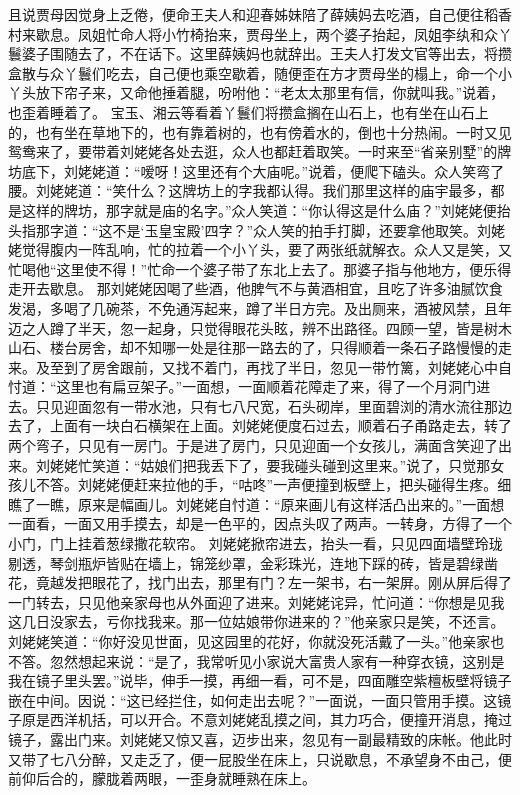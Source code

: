 \documentclass[12pt,oneside]{book}
\begin{document}
且说贾母因觉身上乏倦，便命王夫人和迎春姊妹陪了薛姨妈去吃酒，自己便往稻香村来歇息。凤姐忙命人将小竹椅抬来，贾母坐上，两个婆子抬起，凤姐李纨和众丫鬟婆子围随去了，不在话下。这里薛姨妈也就辞出。王夫人打发文官等出去，将攒盒散与众丫鬟们吃去，自己便也乘空歇着，随便歪在方才贾母坐的榻上，命一个小丫头放下帘子来，又命他捶着腿，吩咐他：“老太太那里有信，你就叫我。”说着，也歪着睡着了。
宝玉、湘云等看着丫鬟们将攒盒搁在山石上，也有坐在山石上的，也有坐在草地下的，也有靠着树的，也有傍着水的，倒也十分热闹。一时又见鸳鸯来了，要带着刘姥姥各处去逛，众人也都赶着取笑。一时来至“省亲别墅”的牌坊底下，刘姥姥道：“嗳呀！这里还有个大庙呢。”说着，便爬下磕头。众人笑弯了腰。刘姥姥道：“笑什么？这牌坊上的字我都认得。我们那里这样的庙宇最多，都是这样的牌坊，那字就是庙的名字。”众人笑道：“你认得这是什么庙？”刘姥姥便抬头指那字道：“这不是‘玉皇宝殿’四字？”众人笑的拍手打脚，还要拿他取笑。刘姥姥觉得腹内一阵乱响，忙的拉着一个小丫头，要了两张纸就解衣。众人又是笑，又忙喝他“这里使不得！”忙命一个婆子带了东北上去了。那婆子指与他地方，便乐得走开去歇息。
那刘姥姥因喝了些酒，他脾气不与黄酒相宜，且吃了许多油腻饮食发渴，多喝了几碗茶，不免通泻起来，蹲了半日方完。及出厕来，酒被风禁，且年迈之人蹲了半天，忽一起身，只觉得眼花头眩，辨不出路径。四顾一望，皆是树木山石、楼台房舍，却不知哪一处是往那一路去的了，只得顺着一条石子路慢慢的走来。及至到了房舍跟前，又找不着门，再找了半日，忽见一带竹篱，刘姥姥心中自忖道：“这里也有扁豆架子。”一面想，一面顺着花障走了来，得了一个月洞门进去。只见迎面忽有一带水池，只有七八尺宽，石头砌岸，里面碧浏的清水流往那边去了，上面有一块白石横架在上面。刘姥姥便度石过去，顺着石子甬路走去，转了两个弯子，只见有一房门。于是进了房门，只见迎面一个女孩儿，满面含笑迎了出来。刘姥姥忙笑道：“姑娘们把我丢下了，要我碰头碰到这里来。”说了，只觉那女孩儿不答。刘姥姥便赶来拉他的手，“咕咚”一声便撞到板壁上，把头碰得生疼。细瞧了一瞧，原来是幅画儿。刘姥姥自忖道：“原来画儿有这样活凸出来的。”一面想一面看，一面又用手摸去，却是一色平的，因点头叹了两声。一转身，方得了一个小门，门上挂着葱绿撒花软帘。
刘姥姥掀帘进去，抬头一看，只见四面墙壁玲珑剔透，琴剑瓶炉皆贴在墙上，锦笼纱罩，金彩珠光，连地下踩的砖，皆是碧绿凿花，竟越发把眼花了，找门出去，那里有门？左一架书，右一架屏。刚从屏后得了一门转去，只见他亲家母也从外面迎了进来。刘姥姥诧异，忙问道：“你想是见我这几日没家去，亏你找我来。那一位姑娘带你进来的？”他亲家只是笑，不还言。刘姥姥笑道：“你好没见世面，见这园里的花好，你就没死活戴了一头。”他亲家也不答。忽然想起来说：“是了，我常听见小家说大富贵人家有一种穿衣镜，这别是我在镜子里头罢。”说毕，伸手一摸，再细一看，可不是，四面雕空紫檀板壁将镜子嵌在中间。因说：“这已经拦住，如何走出去呢？”一面说，一面只管用手摸。这镜子原是西洋机括，可以开合。不意刘姥姥乱摸之间，其力巧合，便撞开消息，掩过镜子，露出门来。刘姥姥又惊又喜，迈步出来，忽见有一副最精致的床帐。他此时又带了七八分醉，又走乏了，便一屁股坐在床上，只说歇息，不承望身不由己，便前仰后合的，朦胧着两眼，一歪身就睡熟在床上。
\end{document}
